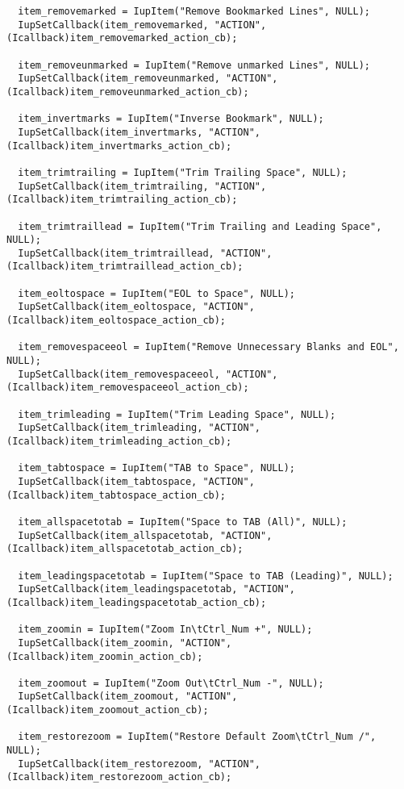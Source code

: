 \documentclass{ctexart}
\begin{document}
\begin{lstlisting}
  item_removemarked = IupItem("Remove Bookmarked Lines", NULL);
  IupSetCallback(item_removemarked, "ACTION", (Icallback)item_removemarked_action_cb);

  item_removeunmarked = IupItem("Remove unmarked Lines", NULL);
  IupSetCallback(item_removeunmarked, "ACTION", (Icallback)item_removeunmarked_action_cb);

  item_invertmarks = IupItem("Inverse Bookmark", NULL);
  IupSetCallback(item_invertmarks, "ACTION", (Icallback)item_invertmarks_action_cb);

  item_trimtrailing = IupItem("Trim Trailing Space", NULL);
  IupSetCallback(item_trimtrailing, "ACTION", (Icallback)item_trimtrailing_action_cb);

  item_trimtraillead = IupItem("Trim Trailing and Leading Space", NULL);
  IupSetCallback(item_trimtraillead, "ACTION", (Icallback)item_trimtraillead_action_cb);

  item_eoltospace = IupItem("EOL to Space", NULL);
  IupSetCallback(item_eoltospace, "ACTION", (Icallback)item_eoltospace_action_cb);

  item_removespaceeol = IupItem("Remove Unnecessary Blanks and EOL", NULL);
  IupSetCallback(item_removespaceeol, "ACTION", (Icallback)item_removespaceeol_action_cb);

  item_trimleading = IupItem("Trim Leading Space", NULL);
  IupSetCallback(item_trimleading, "ACTION", (Icallback)item_trimleading_action_cb);

  item_tabtospace = IupItem("TAB to Space", NULL);
  IupSetCallback(item_tabtospace, "ACTION", (Icallback)item_tabtospace_action_cb);

  item_allspacetotab = IupItem("Space to TAB (All)", NULL);
  IupSetCallback(item_allspacetotab, "ACTION", (Icallback)item_allspacetotab_action_cb);

  item_leadingspacetotab = IupItem("Space to TAB (Leading)", NULL);
  IupSetCallback(item_leadingspacetotab, "ACTION", (Icallback)item_leadingspacetotab_action_cb);

  item_zoomin = IupItem("Zoom In\tCtrl_Num +", NULL);
  IupSetCallback(item_zoomin, "ACTION", (Icallback)item_zoomin_action_cb);

  item_zoomout = IupItem("Zoom Out\tCtrl_Num -", NULL);
  IupSetCallback(item_zoomout, "ACTION", (Icallback)item_zoomout_action_cb);

  item_restorezoom = IupItem("Restore Default Zoom\tCtrl_Num /", NULL);
  IupSetCallback(item_restorezoom, "ACTION", (Icallback)item_restorezoom_action_cb);


\end{lstlisting}
\end{document}
